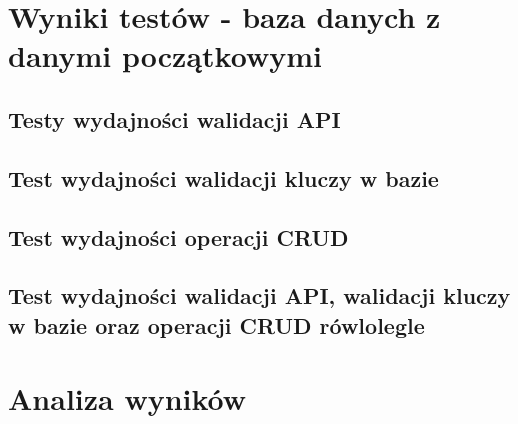 \newpage
\section{Wyniki testów - baza danych z danymi początkowymi}
\subsection{Testy wydajności walidacji API}
%  

\newpage
\subsection{Test wydajności walidacji kluczy w bazie}
% 

\newpage
\subsection{Test wydajności operacji CRUD}
% 

\newpage
\subsection{Test wydajności walidacji API, walidacji kluczy w bazie oraz operacji CRUD rówlolegle }
% 

\newpage
\section{Analiza wyników}

